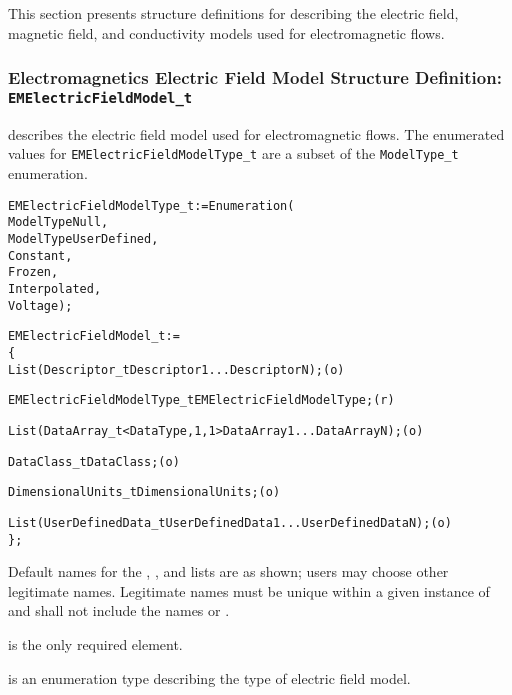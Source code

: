This section presents structure definitions for describing the electric
field, magnetic field, and conductivity models used for electromagnetic
flows.

\subsubsection{Electromagnetics Electric Field Model Structure Definition: \texttt{EMElectricFieldModel\_t}}

 describes the electric field model used
for electromagnetic flows.
The enumerated values for \texttt{EMElectricFieldModelType\_t} are a subset of the
\texttt{ModelType\_t} enumeration.
\begin{alltt}
  EMElectricFieldModelType\_t := Enumeration(
    ModelTypeNull,
    ModelTypeUserDefined,
    Constant,
    Frozen,
    Interpolated,
    Voltage ) ;
\end{alltt}

\begin{alltt}
  EMElectricFieldModel\_t :=
    \{
    List( Descriptor\_t Descriptor1 ... DescriptorN ) ;                      (o)

    EMElectricFieldModelType\_t EMElectricFieldModelType ;                   (r)
    
    List( DataArray\_t<DataType, 1, 1> DataArray1 ... DataArrayN ) ;         (o)

    DataClass\_t DataClass ;                                                 (o)
                
    DimensionalUnits\_t DimensionalUnits ;                                   (o)

    List( UserDefinedData\_t UserDefinedData1 ... UserDefinedDataN ) ;       (o)
    \} ;
\end{alltt}

\begin{notes}
\item Default names for the , , and
      lists are as shown; users may choose other legitimate names.
      Legitimate names must be unique within a given instance of
       and shall not include the names
       or .
\item {} is the only required element.
\end{notes}

 is an enumeration type describing
the type of electric field model.

